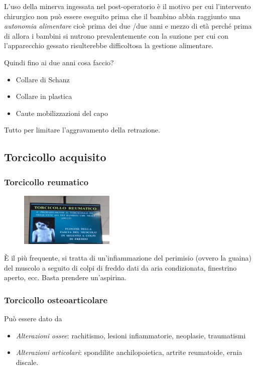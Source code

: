 L'uso della minerva ingessata nel post-operatorio è il motivo per cui l'intervento chirurgico non può essere eseguito prima che il bambino abbia raggiunto una \emph{autonomia alimentare} cioè prima dei due /due
anni e mezzo di età perché prima di allora i bambini si nutrono prevalentemente con la suzione per cui con l'apparecchio gessato risulterebbe difficoltosa la gestione alimentare.

Quindi fino ai due anni cosa faccio?

\begin{itemize}
\item
  Collare di Schanz
\item
  Collare in plastica
\item
  Caute mobilizzazioni del capo
\end{itemize}

Tutto per limitare l'aggravamento della retrazione.

\subsection{Torcicollo acquisito}

\subsubsection{Torcicollo reumatico}

\begin{figure}[!ht]
\centering
\includegraphics[width=0.4\textwidth]{013/image31.jpeg}
\end{figure}

È il più frequente, si tratta di un'infiammazione del perimisio (ovvero la guaina) del muscolo a seguito di colpi di freddo dati da aria condizionata, finestrino aperto, ecc. Basta prendere un'aspirina.

\subsubsection{Torcicollo osteoarticolare}

Può essere dato da

\begin{itemize}
\item
  \emph{Alterazioni ossee}: rachitismo, lesioni infiammatorie, neoplasie, traumatismi
\item
  \emph{Alterazioni articolari}: spondilite anchilopoietica, artrite reumatoide, ernia discale.
\end{itemize}

